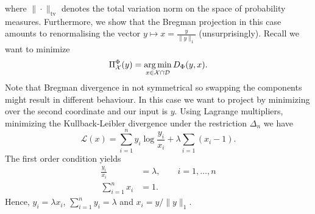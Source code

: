 where $\|\cdot\|_\mathrm{tv}$ denotes the total variation norm on the space of probability measures. Furthermore, we show that the Bregman projection in this case amounts to renormalising the vector $y \mapsto x = \frac{y}{\|y\|_1}$ (unsurprisingly).
Recall we want to minimize
\begin{equation*}
	\Pi_\mathcal{X}^\Phi(y) = \operatorname*{arg\,min}_{x\in \mathcal{X}\cap\mathcal{D}} D_\Phi(y, x).
\end{equation*}
Note that Bregman divergence in not symmetrical so swapping the components might result in different behaviour. In this case we want to project by minimizing over the second coordinate and our input is $y$.
Using Lagrange multipliers, minimizing the Kullback-Leibler divergence under the restriction $\Delta_n$ we have
\begin{equation*}
	\mathcal{L}(x) = \sum_{i=1}^n y_i \log \frac{y_i}{x_i} + \lambda \sum_{i=1}\left(x_i - 1\right).
\end{equation*}
The first order condition yields
\begin{align*}
		\frac{y_i}{x_i} &= \lambda, \qquad i=1, \ldots,n \\
	\sum_{i=1}^n x_i	&= 1.
\end{align*}
Hence, $y_i = \lambda x_i$, $\sum_{i=1}^n y_i = \lambda$ and $x_i = y/\|y\|_1$.

